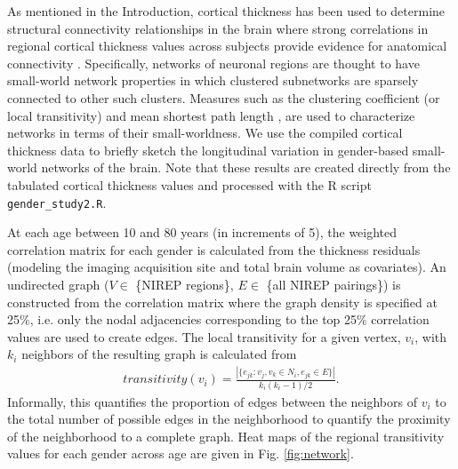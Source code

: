 As mentioned in the Introduction, cortical thickness has
been used to determine structural connectivity relationships in the brain 
where strong correlations in regional cortical 
thickness values across subjects provide evidence for anatomical
connectivity \citep{he2007,chen2008,he2008}.  Specifically, networks of neuronal
regions are thought to have small-world network properties \citep{sporns2004} 
in which clustered subnetworks are sparsely connected to other such clusters.
Measures such as the
clustering coefficient (or local transitivity) and mean shortest path length
\citep{watts1998}, are used to characterize networks in terms of their 
small-worldness.
We use the compiled cortical thickness data to briefly sketch
the longitudinal variation in gender-based small-world networks of the
brain.  Note that these results are created directly from the tabulated 
cortical thickness values and processed with the R script
\verb#gender_study2.R#.

At each age between 10 and 80 years (in increments of 5), the weighted correlation
matrix for each gender is calculated from the thickness residuals 
(modeling the imaging acquisition site and total brain volume as covariates).  An undirected graph ($V \in$ \{NIREP regions\}, $E \in$ \{all NIREP pairings\})
is constructed from the correlation matrix where the graph density is specified at 25\%, i.e. only the nodal adjacencies corresponding to the top 25\% correlation values are used to create edges.    The local transitivity for a given vertex, $v_i$, with $k_i$ neighbors of the resulting graph is calculated from
\begin{align}
  transitivity(v_i) = \frac{|\{e_{jk}: v_j, v_k \in N_i, e_{jk} \in E \}|}{k_i (k_i-1)/2}.
\end{align}
Informally, this quantifies the proportion of edges between the neighbors of $v_i$ to the total number of possible edges in the neighborhood to quantify the proximity of the neighborhood to a complete graph.  Heat maps of the regional transitivity values for each
gender across age are given in Fig. \ref{fig:network}.  






